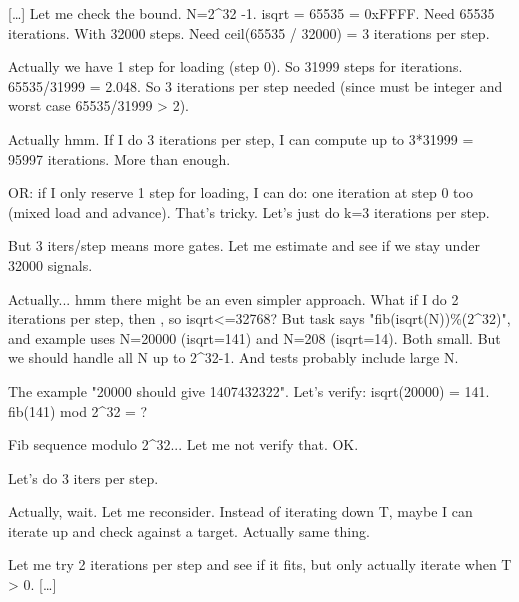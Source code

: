\begin{decodedreasoningpanel}
{[\ldots]} Let me check the bound. N=2\textasciicircum{}32 -1. isqrt = 65535 = 0xFFFF. Need 65535 iterations. With 32000 steps. Need ceil(65535 / 32000) = 3 iterations per step.

Actually we have 1 step for loading (step 0). So 31999 steps for iterations. 65535/31999 = 2.048. So 3 iterations per step needed (since must be integer and worst case 65535/31999 > 2).

Actually hmm. If I do 3 iterations per step, I can compute up to 3*31999 = 95997 iterations. More than enough.

OR: if I only reserve 1 step for loading, I can do: one iteration at step 0 too (mixed load and advance). That's tricky. Let's just do k=3 iterations per step.

But 3 iters/step means more gates. Let me estimate and see if we stay under 32000 signals.

Actually... hmm there might be an even simpler approach. What if I do 2 iterations per step, then , so isqrt<=32768? But task says "fib(isqrt(N))\%(2\textasciicircum{}32)", and example uses N=20000 (isqrt=141) and N=208 (isqrt=14). Both small. But we should handle all N up to 2\textasciicircum{}32-1. And tests probably include large N.

The example "20000 should give 1407432322". Let's verify: isqrt(20000) = 141. fib(141) mod 2\textasciicircum{}32 = ?

Fib sequence modulo 2\textasciicircum{}32... Let me not verify that. OK.

Let's do 3 iters per step.

Actually, wait. Let me reconsider. Instead of iterating down T, maybe I can iterate up and check against a target. Actually same thing.

Let me try 2 iterations per step and see if it fits, but only actually iterate when T > 0. {[\ldots]}
\end{decodedreasoningpanel}
